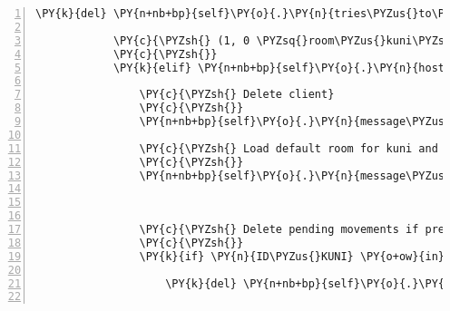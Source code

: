 \begin{Verbatim}[commandchars=\\\{\},numbers=left,firstnumber=1,stepnumber=1]
                    \PY{k}{del} \PY{n+nb+bp}{self}\PY{o}{.}\PY{n}{tries\PYZus{}to\PYZus{}move\PYZus{}dict}\PY{p}{[}\PY{n}{ID\PYZus{}KUNI}\PY{p}{]}

            \PY{c}{\PYZsh{} (1, 0 \PYZsq{}room\PYZus{}kuni\PYZsq{}) \PYZhy{}\PYZgt{} Teleports Kuni to \PYZsq{}room\PYZus{}default\PYZsq{})}
            \PY{c}{\PYZsh{}}
            \PY{k}{elif} \PY{n+nb+bp}{self}\PY{o}{.}\PY{n}{host}\PY{o}{.}\PY{n}{room\PYZus{}by\PYZus{}client}\PY{p}{[}\PY{n}{ID\PYZus{}KUNI}\PY{p}{]}\PY{o}{.}\PY{n}{entity\PYZus{}locations}\PY{p}{[}\PY{n}{ID\PYZus{}KUNI}\PY{p}{]} \PY{o}{==} \PY{p}{(}\PY{l+m+mi}{1}\PY{p}{,} \PY{l+m+mi}{0}\PY{p}{)}\PY{p}{:}

                \PY{c}{\PYZsh{} Delete client}
                \PY{c}{\PYZsh{}}
                \PY{n+nb+bp}{self}\PY{o}{.}\PY{n}{message\PYZus{}for\PYZus{}host}\PY{o}{.}\PY{n}{event\PYZus{}list}\PY{o}{.}\PY{n}{append}\PY{p}{(}\PY{n}{fabula}\PY{o}{.}\PY{n}{DeleteEvent}\PY{p}{(}\PY{n}{ID\PYZus{}KUNI}\PY{p}{)}\PY{p}{)}

                \PY{c}{\PYZsh{} Load default room for kuni and spawn kuni at position (5, 0)}
                \PY{c}{\PYZsh{}}
                \PY{n+nb+bp}{self}\PY{o}{.}\PY{n}{message\PYZus{}for\PYZus{}host}\PY{o}{.}\PY{n}{event\PYZus{}list}\PY{o}{.}\PY{n}{extend}\PY{p}{(}\PY{n+nb+bp}{self}\PY{o}{.}\PY{n}{\PYZus{}load\PYZus{}room}\PY{p}{(}\PY{n}{ID\PYZus{}KUNI}\PY{p}{,}
                                                                        \PY{l+s}{\PYZdq{}}\PY{l+s}{default}\PY{l+s}{\PYZdq{}}\PY{p}{,}
                                                                        \PY{p}{(}\PY{l+m+mi}{5}\PY{p}{,} \PY{l+m+mi}{0}\PY{p}{)}\PY{p}{)}\PY{p}{)}

                \PY{c}{\PYZsh{} Delete pending movements if present}
                \PY{c}{\PYZsh{}}
                \PY{k}{if} \PY{n}{ID\PYZus{}KUNI} \PY{o+ow}{in} \PY{n+nb+bp}{self}\PY{o}{.}\PY{n}{tries\PYZus{}to\PYZus{}move\PYZus{}dict}\PY{o}{.}\PY{n}{keys}\PY{p}{(}\PY{p}{)}\PY{p}{:}

                    \PY{k}{del} \PY{n+nb+bp}{self}\PY{o}{.}\PY{n}{tries\PYZus{}to\PYZus{}move\PYZus{}dict}\PY{p}{[}\PY{n}{ID\PYZus{}KUNI}\PY{p}{]}


\end{Verbatim}
